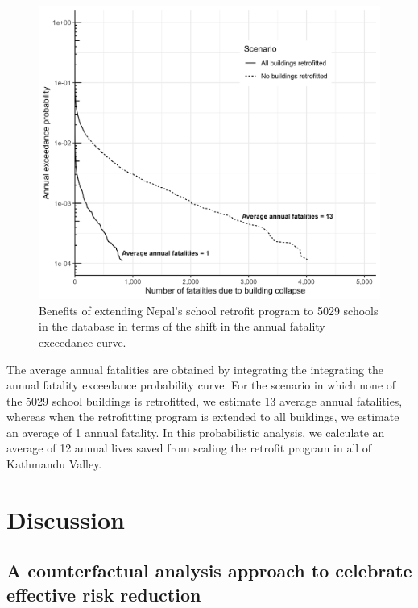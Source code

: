 \begin{figure}[h!] 
\begin{center}
    \includegraphics[width=\linewidth]{Figures/loss_curve_ALL_100k-annotate.png}
	\caption{Benefits of extending Nepal's school retrofit program to 5029 schools in the database in terms of the shift in the annual fatality exceedance curve.}
	\label{fig:losscurve}
\end{center}
\end{figure}

The average annual fatalities are obtained by integrating the integrating the annual fatality exceedance probability curve. For the scenario in which none of the 5029 school buildings is retrofitted, we estimate 13 average annual fatalities, whereas when the retrofitting program is extended to all buildings, we estimate an average of 1 annual fatality. In this probabilistic analysis, we calculate an average of 12 annual lives saved from scaling the retrofit program in all of Kathmandu Valley.
\section{Discussion}
\label{section-discussion}

\subsection{A counterfactual analysis approach to celebrate effective risk reduction}


